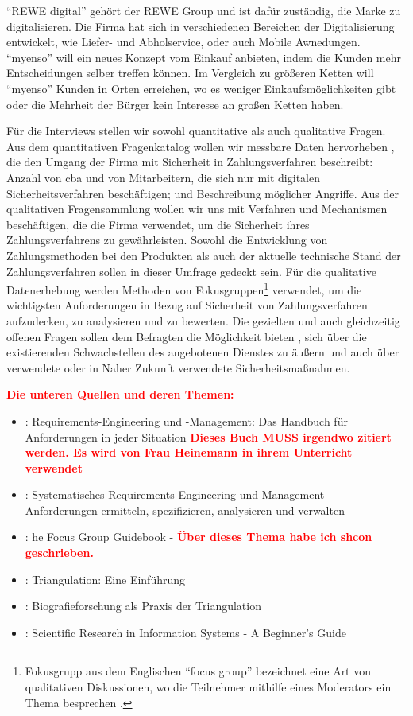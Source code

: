 ``REWE digital'' gehört der REWE Group und ist dafür zuständig, die Marke zu digitalisieren. Die Firma hat sich
in verschiedenen Bereichen der Digitalisierung entwickelt, wie Liefer- und Abholservice, oder auch Mobile Awnedungen. 
``myenso'' will ein neues Konzept vom Einkauf anbieten, indem die Kunden mehr Entscheidungen selber treffen können. 
Im Vergleich zu größeren Ketten will ``myenso'' Kunden in Orten erreichen, wo es weniger Einkaufsmöglichkeiten gibt
oder die Mehrheit der Bürger kein Interesse an großen Ketten haben.


Für die Interviews stellen wir sowohl quantitative als auch qualitative Fragen. Aus dem quantitativen Fragenkatalog
wollen wir messbare Daten hervorheben \cite{refbook:SRJR}, die den Umgang der Firma mit Sicherheit in Zahlungsverfahren
beschreibt: Anzahl von \acrfull{cba} und von Mitarbeitern, die sich nur mit digitalen Sicherheitsverfahren beschäftigen;
und Beschreibung möglicher Angriffe. Aus der qualitativen Fragensammlung wollen wir uns mit Verfahren 
und Mechanismen beschäftigen, die die Firma verwendet, um die Sicherheit ihres Zahlungsverfahrens zu gewährleisten. 
Sowohl die Entwicklung von Zahlungsmethoden bei den Produkten als auch der aktuelle technische Stand der Zahlungsverfahren
sollen in dieser Umfrage gedeckt sein. Für die qualitative Datenerhebung werden Methoden von Fokusgruppen\footnote{Fokusgrupp
aus dem Englischen ``focus group'' bezeichnet eine Art von qualitativen Diskussionen, wo die Teilnehmer mithilfe eines 
Moderators ein Thema besprechen \cite{refbook:APGF}.} verwendet, um die wichtigsten Anforderungen in Bezug auf Sicherheit von 
Zahlungsverfahren aufzudecken, zu analysieren und zu bewerten. Die gezielten und auch gleichzeitig offenen Fragen sollen dem
Befragten die Möglichkeit bieten \cite{refbook:EFAF}, sich über die existierenden Schwachstellen des angebotenen
Dienstes zu äußern und auch über verwendete oder in Naher Zukunft verwendete Sicherheitsmaßnahmen.

\textcolor{red}{\textbf{Die unteren Quellen und deren Themen:}}
\begin{itemize}
  \item \cite{refbook:RECR}: Requirements-Engineering und -Management: 
  Das Handbuch für Anforderungen in jeder Situation \textcolor{red}{\textbf{Dieses Buch MUSS irgendwo
  zitiert werden. Es wird von Frau Heinemann in ihrem Unterricht verwendet }}
  \item \cite{refbook:CESR}: Systematisches Requirements Engineering und Management 
  - Anforderungen ermitteln,   spezifizieren, analysieren und verwalten
  \item \cite{refbook:DMFG}: he Focus Group Guidebook - 
  \textcolor{red}{\textbf{Über dieses Thema habe ich shcon geschrieben.}}
  \item \cite{refbook:TEUF}: Triangulation: Eine Einführung
  \item \cite{refbook:BPAG}: Biografieforschung als Praxis der Triangulation
  \item \cite{refbook:RMJL}: Scientific Research in Information Systems - A Beginner's Guide
\end{itemize}


